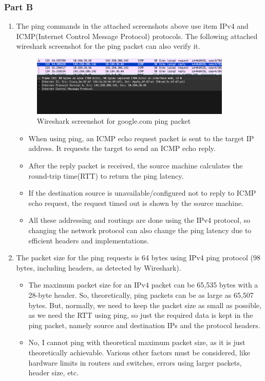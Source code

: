 \documentclass{article}
\begin{document}
\subsubsection{Part B}
\begin{enumerate}
    \item The ping commands in the attached screenshots above use item IPv4 and ICMP(Internet Control Message Protocol) protocols. The following attached wireshark screenshot for the ping packet can also verify it.
    
        \begin{figure}[ht]
        \centering
        \includegraphics[width=0.9\textwidth]{ping_wireshark.png}
        \caption*{Wireshark screenshot for google.com ping packet}
        \end{figure}
    
        \begin{itemize}
            \item When using ping, an ICMP echo request packet is sent to the target IP address. It requests the target to send an ICMP echo reply.
            \item After the reply packet is received, the source machine calculates the round-trip time(RTT) to return the ping latency.
            \item If the destination source is unavailable/configured not to reply to ICMP echo request, the request timed out is shown by the source machine.
            \item All these addressing and routings are done using the IPv4 protocol, so changing the network protocol can also change the ping latency due to efficient headers and implementations.
        \end{itemize}

    \item The packet size for the ping requests is 64 bytes using IPv4 ping protocol (98 bytes, including headers, as detected by Wireshark). 
    \begin{itemize}
        \item The maximum packet size for an IPv4 packet can be 65,535 bytes with a 28-byte header. So, theoretically, ping packets can be as large as 65,507 bytes. But, normally, we need to keep the packet size as small as possible, as we need the RTT using ping, so just the required data is kept in the ping packet, namely source and destination IPs and the protocol headers.
        \item No, I cannot ping with theoretical maximum packet size, as it is just theoretically achievable. Various other factors must be considered, like hardware limits in routers and switches, errors using larger packets, header size, etc.
        
    \end{itemize}
\end{enumerate}
\end{document}
